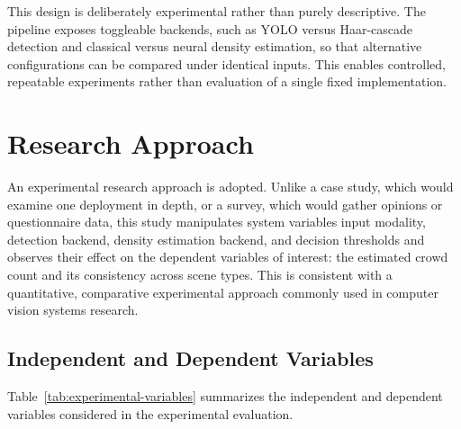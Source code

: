 \documentclass[12pt,a4paper]{report}
\begin{document}
This design is deliberately experimental rather than purely descriptive. The pipeline exposes toggleable backends, such as YOLO versus Haar-cascade detection and classical versus neural density estimation, so that alternative configurations can be compared under identical inputs. This enables controlled, repeatable experiments rather than evaluation of a single fixed implementation.

\section{Research Approach}

An experimental research approach is adopted. Unlike a case study, which would examine one deployment in depth, or a survey, which would gather opinions or questionnaire data, this study manipulates system variables input modality, detection backend, density estimation backend, and decision thresholds and observes their effect on the dependent variables of interest: the estimated crowd count and its consistency across scene types. This is consistent with a quantitative, comparative experimental approach commonly used in 
computer vision systems research.

\subsection{Independent and Dependent Variables}

Table~\ref{tab:experimental-variables} summarizes the independent and
dependent variables considered in the experimental evaluation.
\end{document}
